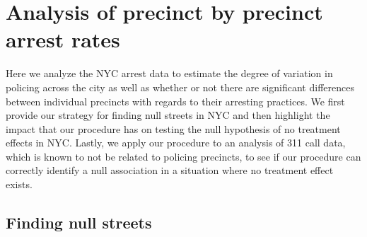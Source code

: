 \documentclass[a4paper,11pt]{article}
\begin{document}
\section{Analysis of precinct by precinct arrest rates}

Here we analyze the NYC arrest data to estimate the degree of variation in policing across the city as well as whether or not there are significant differences between individual precincts with regards to their arresting practices. We first provide our strategy for finding null streets in NYC and then highlight the impact that our procedure has on testing the null hypothesis of no treatment effects in NYC. Lastly, we apply our procedure to an analysis of 311 call data, which is known to not be related to policing precincts, to see if our procedure can correctly identify a null association in a situation where no treatment effect exists. 

\subsection{Finding null streets}
\label{sec:MatchesNYC}


\end{document}
